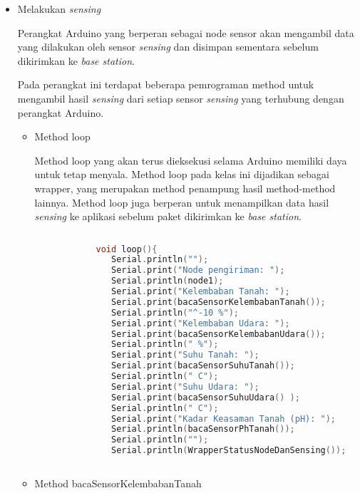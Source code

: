    
    \begin{itemize}
        \item Melakukan \textit{sensing}
        
        Perangkat Arduino yang berperan sebagai node sensor akan mengambil data yang dilakukan oleh sensor \textit{sensing} dan disimpan sementara sebelum dikirimkan ke \textit{base station}.
        
        Pada perangkat ini terdapat beberapa pemrograman method untuk mengambil hasil \textit{sensing} dari setiap sensor \textit{sensing} yang terhubung dengan perangkat Arduino.
        
         
        
        \begin{itemize}
            \item Method loop
            
             Method loop yang akan terus dieksekusi selama Arduino memiliki daya untuk tetap menyala. Method loop pada kelas ini dijadikan sebagai wrapper, yang merupakan method penampung hasil method-method lainnya. Method loop juga berperan untuk menampilkan data hasil \textit{sensing} ke aplikasi sebelum paket dikirimkan ke \textit{base station}.
             
             \begin{lstlisting}[label=loop, language=C, caption=Metode loop(), numbers=none]
   
            void loop(){
               Serial.println("");
               Serial.print("Node pengiriman: ");
               Serial.println(node1);
               Serial.print("Kelembaban Tanah: "); 
               Serial.print(bacaSensorKelembabanTanah());
               Serial.println("^-10 %");
               Serial.print("Kelembaban Udara: ");
               Serial.print(bacaSensorKelembabanUdara());
               Serial.println(" %");
               Serial.print("Suhu Tanah: ");
               Serial.print(bacaSensorSuhuTanah());
               Serial.println(" C");
               Serial.print("Suhu Udara: ");
               Serial.print(bacaSensorSuhuUdara() );
               Serial.println(" C");
               Serial.print("Kadar Keasaman Tanah (pH): ");
               Serial.println(bacaSensorPhTanah());
               Serial.println("");
               Serial.println(WrapperStatusNodeDanSensing());
               
        \end{lstlisting}
        
        
            \item Method bacaSensorKelembabanTanah
            

\end{itemize}
\end{itemize}
